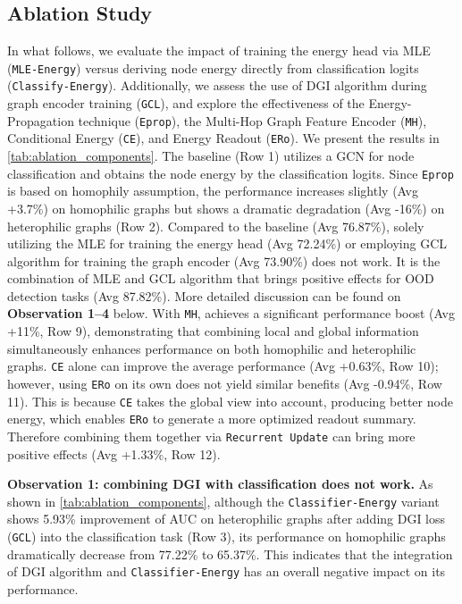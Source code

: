 \vspace{-2mm}
\subsection{Ablation Study}
\vspace{-2mm}
\label{sec:ablation}

In what follows, we evaluate the impact of training the energy head via MLE (\texttt{MLE-Energy}) versus deriving node energy directly from classification logits (\texttt{Classify-Energy}).
Additionally, we assess the use of DGI algorithm during graph encoder training (\texttt{GCL}), and explore the effectiveness of the Energy-Propagation technique (\texttt{Eprop}), the Multi-Hop Graph Feature Encoder (\texttt{MH}), Conditional Energy (\texttt{CE}), and Energy Readout (\texttt{ERo}). 
We present the results in \cref{tab:ablation_components}. 
The baseline (Row 1) utilizes a GCN for node classification and obtains the node energy by the classification logits. 
Since \texttt{Eprop} is based on homophily assumption, the performance increases slightly (Avg +3.7\%) on homophilic graphs but shows a dramatic degradation (Avg -16\%) on heterophilic graphs (Row 2). 
Compared to the baseline (Avg 76.87\%), solely utilizing the MLE for training the energy head (Avg 72.24\%) or employing GCL algorithm for training the graph encoder (Avg 73.90\%) does not work. It is the combination of MLE and GCL algorithm that brings positive effects for OOD detection tasks (Avg 87.82\%). More detailed discussion can be found on \textbf{Observation 1--4} below. 
With \texttt{MH}, \shortname achieves a significant performance boost (Avg +11\%, Row 9), demonstrating that combining local and global information simultaneously enhances performance on both homophilic and heterophilic graphs. 
\texttt{CE} alone can improve the average performance (Avg +0.63\%, Row 10); however, using \texttt{ERo} on its own does not yield similar benefits (Avg -0.94\%, Row 11). 
This is because \texttt{CE} takes the global view into account, producing better node energy, which enables \texttt{ERo} to generate a more optimized readout summary. Therefore combining them together via \texttt{Recurrent Update} can bring more positive effects (Avg +1.33\%, Row 12).

\textbf{Observation 1: combining DGI with classification does not work.} 
As shown in \cref{tab:ablation_components}, although the \texttt{Classifier-Energy} variant shows 5.93\% improvement of AUC on heterophilic graphs after adding DGI loss (\texttt{GCL}) into the classification task (Row 3), its performance on homophilic graphs dramatically decrease from 77.22\% to 65.37\%. This indicates that the integration of DGI algorithm and \texttt{Classifier-Energy} has an overall negative impact on its performance.


